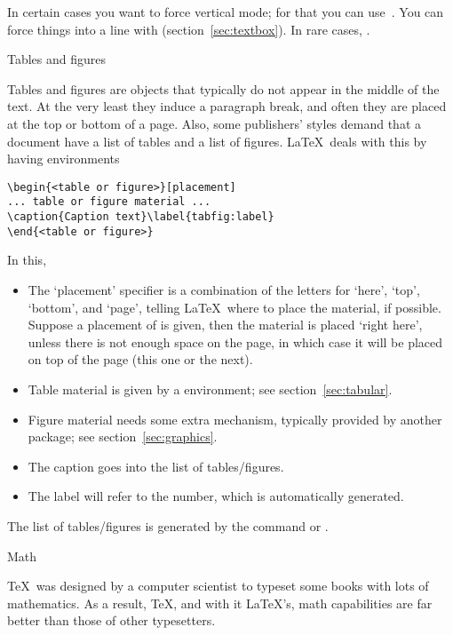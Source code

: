 In certain cases you want to force vertical mode; for that you can
use~. You can force things into a line with
 (section~\ref{sec:textbox}). In rare cases, .


 {Tables and figures}
\label{sec:float}

Tables and figures are objects that typically do not appear in the
middle of the text. At the very least they induce a paragraph break,
and often they are placed at the top or bottom of a page. Also, some
publishers' styles demand that a document have a list of tables and a
list of figures. \LaTeX\ deals with this by having environments
\begin{verbatim}
\begin{<table or figure>}[placement]
... table or figure material ...
\caption{Caption text}\label{tabfig:label}
\end{<table or figure>}
\end{verbatim}
In this,
\begin{itemize}
\item The `placement' specifier is a combination of the letters
   for `here', `top', `bottom', and `page', telling
  \LaTeX\ where to place the material, if possible. Suppose a
  placement of \n{[ht]} is given, then the material is placed `right
  here', unless there is not enough space on the page, in which case
  it will be placed on top of the page (this one or the next).
\item Table material is given by a  environment; see
  section~\ref{sec:tabular}.
\item Figure material needs some extra mechanism, typically provided
  by another package; see section~\ref{sec:graphics}.
\item The caption goes into the list of tables/figures.
\item The label will refer to the number, which is automatically
  generated.
\end{itemize}
The list of tables/figures is generated by the command
 or .

 {Math}
\label{sec:math}

\TeX\ was designed by a computer scientist to typeset some books with
lots of mathematics. As a result, \TeX, and with it \LaTeX's, math
capabilities are far better than those of other typesetters.
 

